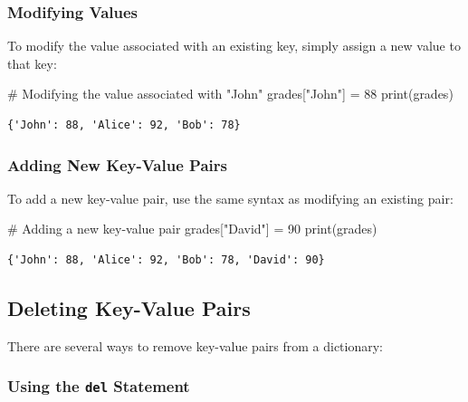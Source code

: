 \documentclass[
  letterpaper,
  DIV=11,
  numbers=noendperiod]{scrreprt}
\newenvironment{Shaded}{\begin{snugshade}}{\end{snugshade}}
\newcommand{\BuiltInTok}[1]{\textcolor[rgb]{0.00,0.23,0.31}{#1}}
\newcommand{\CommentTok}[1]{\textcolor[rgb]{0.37,0.37,0.37}{#1}}
\newcommand{\DecValTok}[1]{\textcolor[rgb]{0.68,0.00,0.00}{#1}}
\newcommand{\NormalTok}[1]{\textcolor[rgb]{0.00,0.23,0.31}{#1}}
\newcommand{\OperatorTok}[1]{\textcolor[rgb]{0.37,0.37,0.37}{#1}}
\newcommand{\StringTok}[1]{\textcolor[rgb]{0.13,0.47,0.30}{#1}}
\begin{document}
\hypertarget{modifying-values}{%
\subsubsection{Modifying Values}\label{modifying-values}}

To modify the value associated with an existing key, simply assign a new
value to that key:

\begin{Shaded}
\begin{Highlighting}[]
\CommentTok{\# Modifying the value associated with "John"}
\NormalTok{grades[}\StringTok{"John"}\NormalTok{] }\OperatorTok{=} \DecValTok{88}
\BuiltInTok{print}\NormalTok{(grades)  }
\end{Highlighting}
\end{Shaded}

\begin{verbatim}
{'John': 88, 'Alice': 92, 'Bob': 78}
\end{verbatim}

\hypertarget{adding-new-key-value-pairs}{%
\subsubsection{Adding New Key-Value
Pairs}\label{adding-new-key-value-pairs}}

To add a new key-value pair, use the same syntax as modifying an
existing pair:

\begin{Shaded}
\begin{Highlighting}[]
\CommentTok{\# Adding a new key{-}value pair}
\NormalTok{grades[}\StringTok{"David"}\NormalTok{] }\OperatorTok{=} \DecValTok{90}
\BuiltInTok{print}\NormalTok{(grades) }
\end{Highlighting}
\end{Shaded}

\begin{verbatim}
{'John': 88, 'Alice': 92, 'Bob': 78, 'David': 90}
\end{verbatim}

\hypertarget{deleting-key-value-pairs}{%
\subsection{Deleting Key-Value Pairs}\label{deleting-key-value-pairs}}

There are several ways to remove key-value pairs from a dictionary:

\hypertarget{using-the-del-statement}{%
\subsubsection{\texorpdfstring{Using the \texttt{del}
Statement}{Using the del Statement}}\label{using-the-del-statement}}
\end{document}
